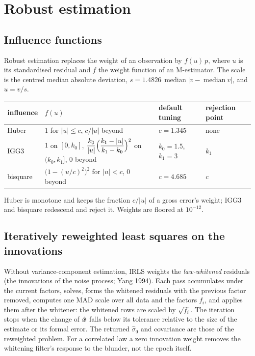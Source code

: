 \chapter{Robust estimation}\label{ch:robust}

\section{Influence functions}

Robust estimation replaces the weight of an observation by $f(u)\,p$, where $u$ is its
standardised residual and $f$ the weight function of an M-estimator. The scale is the centred
median absolute deviation, $s=1.4826\,\operatorname{median}|v-\operatorname{median}v|$, and $u=v/s$.

\begin{center}
\begin{tabular}{@{}llll@{}}
\toprule
influence & $f(u)$ & default tuning & rejection point \\ \midrule
Huber & $1$ for $|u|\le c$, $c/|u|$ beyond & $c=1.345$ & none \\
IGG3 & $1$ on $[0,k_0]$, $\dfrac{k_0}{|u|}\Bigl(\dfrac{k_1-|u|}{k_1-k_0}\Bigr)^2$ on $(k_0,k_1]$, $0$ beyond & $k_0=1.5$, $k_1=3$ & $k_1$\\
bisquare & $\bigl(1-(u/c)^2\bigr)^2$ for $|u|<c$, $0$ beyond & $c=4.685$ & $c$ \\
\bottomrule
\end{tabular}
\end{center}

Huber is monotone and keeps the fraction $c/|u|$ of a gross error's weight; IGG3 and bisquare
redescend and reject it. Weights are floored at $10^{-12}$.

\section{Iteratively reweighted least squares on the innovations}\label{sec:irls}

Without variance-component estimation, IRLS weights the \emph{law-whitened} residuals (the
innovations of the noise process; Yang 1994). Each pass accumulates under the current factors,
solves, forms the whitened residuals with the previous factor removed, computes one MAD scale over
all data and the factors $f_i$, and applies them after the whitener: the whitened rows are scaled
by $\sqrt{f_i}$. The iteration stops when the change of $\hat{\bm{x}}$ falls below its tolerance
relative to the size of the estimate or its formal error. The returned $\hat\sigma_0$ and covariance
are those of the reweighted problem. For a correlated law a zero innovation weight removes the
whitening filter's response to the blunder, not the epoch itself.

